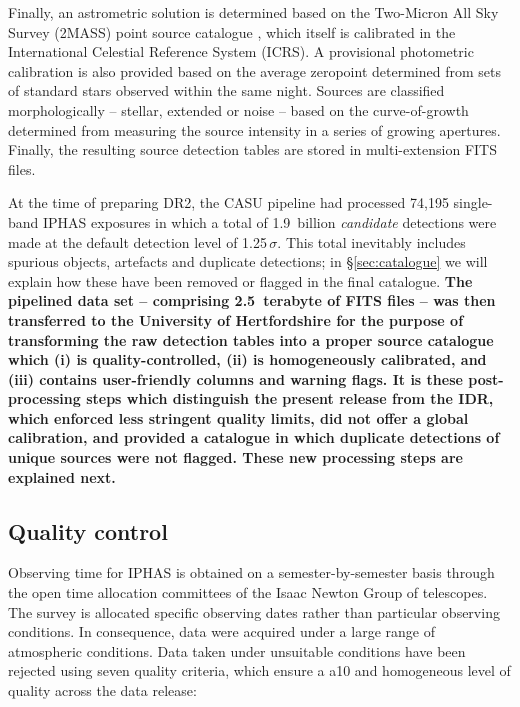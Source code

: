 \documentclass[a4paper,useAMS,usenatbib]{mn2e}
\begin{document}
Finally, an astrometric solution is determined
based on the Two-Micron All Sky Survey (2MASS) point source catalogue \citep{Skrutskie2006},
which itself is calibrated 
in the International Celestial Reference System (ICRS).
A provisional photometric calibration is also provided 
based on the average zeropoint
determined from sets of standard stars observed within the same night.
Sources are classified morphologically
-- stellar, extended or noise --
based on the curve-of-growth determined
from measuring the source intensity in a series of growing apertures.
Finally, the resulting source detection tables are stored 
in multi-extension FITS files.

At the time of preparing DR2,
the CASU pipeline had processed
74,195 single-band IPHAS exposures 
in which a total of 1.9~billion \emph{candidate} detections
were made at the default detection level of 1.25\,$\sigma$.
This total inevitably includes spurious objects, artefacts and
duplicate detections;
in \S\ref{sec:catalogue} we will explain
how these have been removed or flagged in the final catalogue.
{ \bf
The pipelined data set -- comprising 2.5~terabyte of FITS files --
was then transferred to the University of Hertfordshire
for the purpose of transforming the raw
detection tables into a proper source catalogue which
(i) is quality-controlled,
(ii) is homogeneously calibrated, and 
(iii) contains user-friendly columns and warning flags.
It is these post-processing steps which distinguish the present release
from the IDR, which enforced less stringent quality limits,
did not offer a global calibration,
and provided a catalogue in which duplicate detections
of unique sources were not flagged.
These new processing steps are explained next.}


\subsection{Quality control}
\label{sec:qc}

Observing time for IPHAS is obtained
on a semester-by-semester basis
through the open time allocation committees 
of the Isaac Newton Group of telescopes.
The survey is allocated specific observing dates
rather than particular observing conditions.
In consequence, data were acquired
under a large range of atmospheric conditions.
Data taken under unsuitable conditions
have been rejected using seven quality criteria,
which ensure a a10 and homogeneous level of quality
across the data release:
\end{document}

